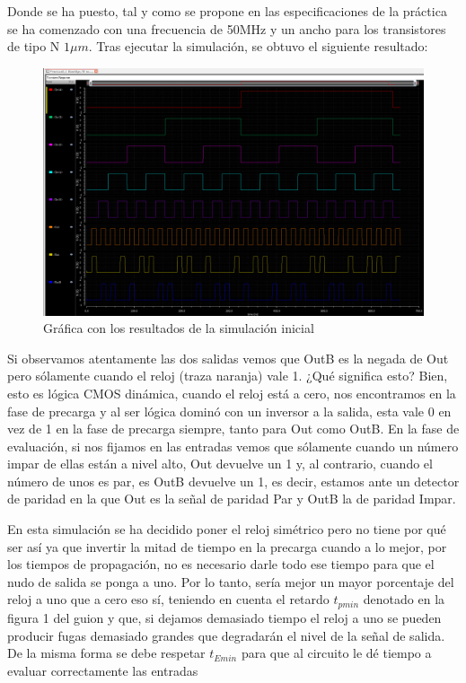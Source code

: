 Donde se ha puesto, tal y como se propone en las especificaciones de la práctica se ha comenzado con una frecuencia de 50MHz y un ancho para los transistores de tipo N $1\mu m$.
\newpage Tras ejecutar la simulación, se obtuvo el siguiente resultado:
\begin{figure}[h]%
\begin {center}
\includegraphics[width=1\textwidth]{figures/GraphState1TB.PNG}
\caption{Gráfica con los resultados de la simulación inicial}
\label{fig:GraphState1}
\end {center}
\end{figure} \newline
Si observamos atentamente las dos salidas vemos que OutB es la negada de Out pero sólamente cuando el reloj (traza naranja) vale 1. ¿Qué significa esto? Bien, esto es lógica CMOS dinámica, cuando el reloj está a cero, nos encontramos en la fase de precarga y al ser lógica dominó con un inversor a la salida, esta vale 0 en vez de 1 en la fase de precarga siempre, tanto para Out como OutB. En la fase de evaluación, si nos fijamos en las entradas vemos que sólamente cuando un número impar de ellas están a nivel alto, Out devuelve un 1 y, al contrario, cuando el número de unos es par, es OutB devuelve un 1, es decir, estamos ante un detector de paridad en la que Out es la señal de paridad Par y OutB la de paridad Impar.
\par En esta simulación se ha decidido poner el reloj simétrico pero no tiene por qué ser así ya que invertir la mitad de tiempo en la precarga cuando a lo mejor, por los tiempos de propagación, no es necesario darle todo ese tiempo para que el nudo de salida se ponga a uno.  Por lo tanto, sería mejor un mayor porcentaje del reloj a uno que a cero eso sí, teniendo en cuenta el retardo $t_{pmin}$ denotado en la figura 1 del guion \cite{Guion} y que, si dejamos demasiado tiempo el reloj a uno se pueden producir fugas demasiado grandes que degradarán el nivel de la señal de salida.  De la misma forma se debe respetar $t_{Emin}$ para que al circuito le dé tiempo a evaluar correctamente las entradas\newpage
